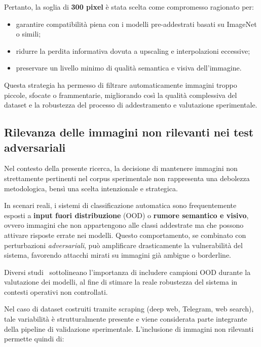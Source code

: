 Pertanto, la soglia di \textbf{300 pixel} è stata scelta come compromesso ragionato per:

\begin{itemize}
  \item garantire compatibilità piena con i modelli pre-addestrati basati su ImageNet o simili;
  \item ridurre la perdita informativa dovuta a upscaling e interpolazioni eccessive;
  \item preservare un livello minimo di qualità semantica e visiva dell'immagine.
\end{itemize}

Questa strategia ha permesso di filtrare automaticamente immagini troppo piccole, sfocate o frammentarie, migliorando così la qualità complessiva del dataset e la robustezza del processo di addestramento e valutazione sperimentale.






\subsection*{Rilevanza delle immagini non rilevanti nei test adversariali}
Nel contesto della presente ricerca, la decisione di mantenere immagini non strettamente pertinenti nel corpus sperimentale non rappresenta una debolezza metodologica, bensì una scelta intenzionale e strategica.

In scenari reali, i sistemi di classificazione automatica sono frequentemente esposti a \textbf{input fuori distribuzione} (OOD) o \textbf{rumore semantico e visivo}, ovvero immagini che non appartengono alle classi addestrate ma che possono attivare risposte errate nei modelli. Questo comportamento, se combinato con perturbazioni \textit{adversariali}, può amplificare drasticamente la vulnerabilità del sistema, favorendo attacchi mirati su immagini già ambigue o borderline.

Diversi studi~\cite{hendrycks2017baseline,fort2021exploring} sottolineano l'importanza di includere campioni OOD durante la valutazione dei modelli, al fine di stimare la reale robustezza del sistema in contesti operativi non controllati.

Nel caso di dataset costruiti tramite scraping (deep web, Telegram, web search), tale variabilità è strutturalmente presente e viene considerata parte integrante della pipeline di validazione sperimentale. L’inclusione di immagini non rilevanti permette quindi di:

